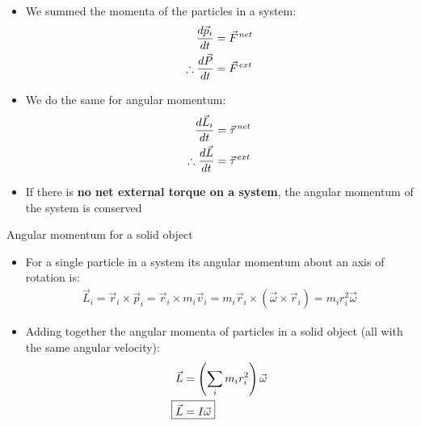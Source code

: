 \documentclass[aspectratio=169,
hyperref={colorlinks,urlcolor=blue}
]{beamer}
\begin{document}
{
\begin{itemize}
\item We summed the momenta of the particles in a system:
\begin{align*}
\frac{d\vec p_i}{dt}&=\pvec F^{net}\\
\therefore \frac{d\vec P}{dt}&=\pvec F^{ext}
\end{align*}
\item We do the same for angular momentum:
\begin{align*}
\frac{d\vec L_i}{dt}&=\pvec \tau^{net}\\
\therefore \frac{d\vec L}{dt}&=\pvec \tau^{ext}
\end{align*}
\item If there is \textbf{no net external torque on a system}, the angular momentum of the system is conserved
\end{itemize}
}
{
\begin{center}
\end{center}
}


\begin{frame}{Angular momentum for a solid object}
\begin{itemize}
\item For a single particle in a system its angular momentum about an axis of rotation is:
\begin{align*}
\vec L_i = \vec r_i\times \vec p_i = \vec r_i \times m_i\vec v_i=m_i \vec r_i \times (\vec \omega \times\vec r_i)=m_ir_i^2\vec \omega
\end{align*}
\item Adding together the angular momenta of particles in a solid object (all with the same angular velocity):
\begin{align*}
\vec L &= \left(\sum_i m_ir_i^2 \right) \vec \omega\\
\Aboxed{\vec L &=I\vec\omega}
\end{align*}
\end{itemize}

\end{frame}
\end{document}
